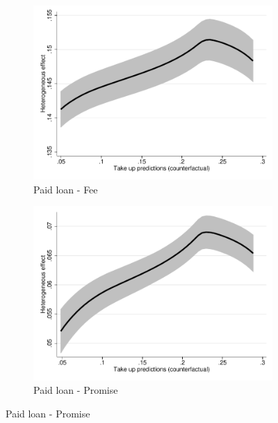 \documentclass[11pt]{article}
\begin{document}
\begin{figure}[H]
    \caption{Take-up Fee against HTE}
    \label{takeup_hte}
    \begin{center}
    \begin{subfigure}{0.45\textwidth}
        \caption{Paid loan - Fee}
        \centering
        \includegraphics[width=\textwidth]{Figuras/takeup_he_pro_2_pago_frec_vol_fee_des_c.pdf}
    \end{subfigure}
    \begin{subfigure}{0.45\textwidth}
        \caption{Paid loan - Promise}
        \centering
        \includegraphics[width=\textwidth]{Figuras/takeup_he_pro_3_pago_frec_vol_fee_des_c.pdf}
    \end{subfigure}
    

\end{center}
\end{figure}
\end{document}

